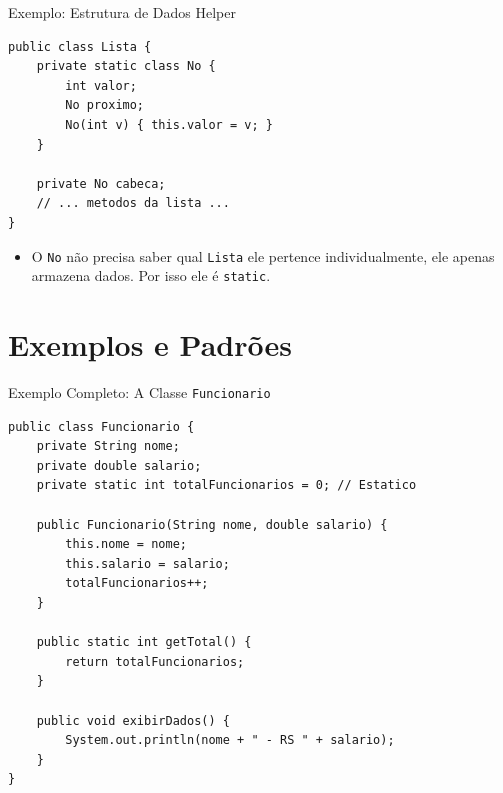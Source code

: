 \documentclass[9pt]{beamer}
\begin{document}
\begin{frame}[fragile]{Exemplo: Estrutura de Dados Helper}
\begin{lstlisting}
public class Lista {
    private static class No {
        int valor;
        No proximo;
        No(int v) { this.valor = v; }
    }

    private No cabeca;
    // ... metodos da lista ...
}
\end{lstlisting}
    \begin{itemize}
        \item O \texttt{No} não precisa saber qual \texttt{Lista} ele pertence individualmente, ele apenas armazena dados. Por isso ele é \texttt{static}.
    \end{itemize}
\end{frame}

\section{Exemplos e Padrões}

\begin{frame}[fragile]{Exemplo Completo: A Classe \texttt{Funcionario}}
\begin{lstlisting}
public class Funcionario {
    private String nome; 
    private double salario;
    private static int totalFuncionarios = 0; // Estatico

    public Funcionario(String nome, double salario) {
        this.nome = nome;
        this.salario = salario;
        totalFuncionarios++;
    }

    public static int getTotal() {
        return totalFuncionarios;
    }

    public void exibirDados() {
        System.out.println(nome + " - RS " + salario);
    }
}
\end{lstlisting}
\end{frame}
\end{document}
